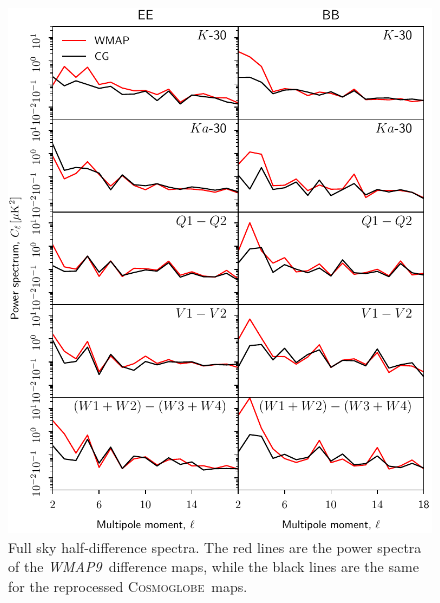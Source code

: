 \documentclass[twocolumn]{../../common/aa}
\def\WMAP{\emph{WMAP}}
\def\WMAPnine{\emph{WMAP9}}
\newcommand{\cosmoglobe}{\textsc{Cosmoglobe}}
\begin{document}
\begin{figure}
	\centering
	\includegraphics[width=\linewidth]{figures/cls_cg_WMAP_lowl.pdf}
	\caption{Full sky half-difference spectra. The red lines are the power spectra of the \WMAPnine\ difference maps, while the black lines are the same for the reprocessed \cosmoglobe\ maps.}
        \label{fig:cl_halfdiff}
\end{figure}






\end{document}
